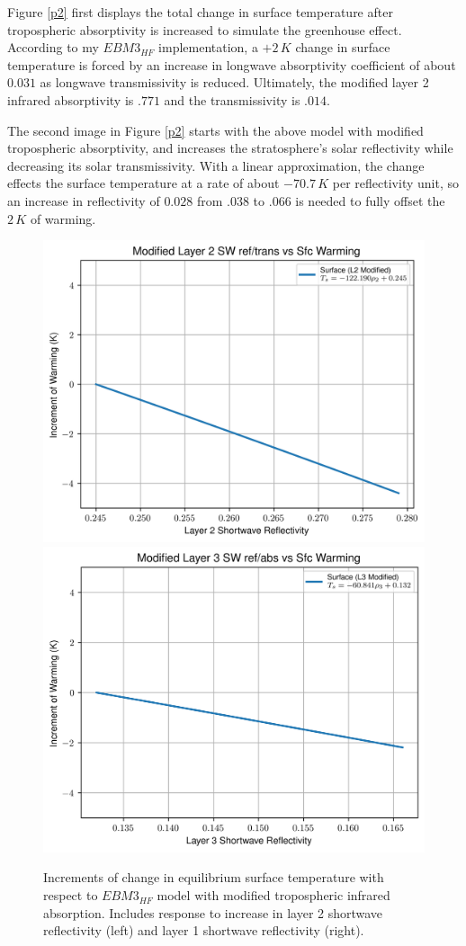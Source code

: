 \documentclass[12pt]{article}
\begin{document}
Figure \ref{p2} first displays the total change in surface temperature after tropospheric absorptivity is increased to simulate the greenhouse effect. According to my $EBM3_{HF}$ implementation, a $+2\,\si{K}$ change in surface temperature is forced by an increase in longwave absorptivity coefficient of about $0.031$ as longwave transmissivity is reduced. Ultimately, the modified layer 2 infrared absorptivity is $.771$  and the transmissivity is $.014$.

The second image in Figure \ref{p2} starts with the above model with modified tropospheric absorptivity, and increases the stratosphere's solar reflectivity while decreasing its solar transmissivity. With a linear approximation, the change effects the surface temperature at a rate of about $-70.7\,\si{K}$ per reflectivity unit, so an increase in reflectivity of $0.028$ from $.038$ to $.066$ is needed to fully offset the $2\,\si{K}$ of warming.

\clearpage

\begin{figure}[h!]\label{p3p4}
    \centering
    \includegraphics[width=.48\linewidth]{p3.png}
    \includegraphics[width=.48\linewidth]{p4.png}
    \caption{Increments of change in equilibrium surface temperature with respect to $EBM3_{HF}$ model with modified tropospheric infrared absorption. Includes response to increase in layer 2 shortwave reflectivity (left) and layer 1 shortwave reflectivity (right).}
\end{figure}
\end{document}

